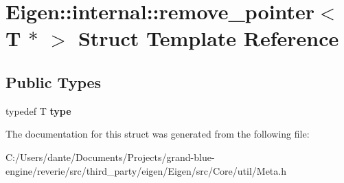 \hypertarget{struct_eigen_1_1internal_1_1remove__pointer_3_01_t_01_5_01_4}{}\section{Eigen\+::internal\+::remove\+\_\+pointer$<$ T $\ast$ $>$ Struct Template Reference}
\label{struct_eigen_1_1internal_1_1remove__pointer_3_01_t_01_5_01_4}
\subsection*{Public Types}
\begin{DoxyCompactItemize}
\item 
\mbox{\label{struct_eigen_1_1internal_1_1remove__pointer_3_01_t_01_5_01_4_a4b303d342d6f988b381ee5a7cc37b269}} 
typedef T {\bfseries type}
\end{DoxyCompactItemize}


The documentation for this struct was generated from the following file\+:\begin{DoxyCompactItemize}
\item 
C\+:/\+Users/dante/\+Documents/\+Projects/grand-\/blue-\/engine/reverie/src/third\+\_\+party/eigen/\+Eigen/src/\+Core/util/Meta.\+h\end{DoxyCompactItemize}
